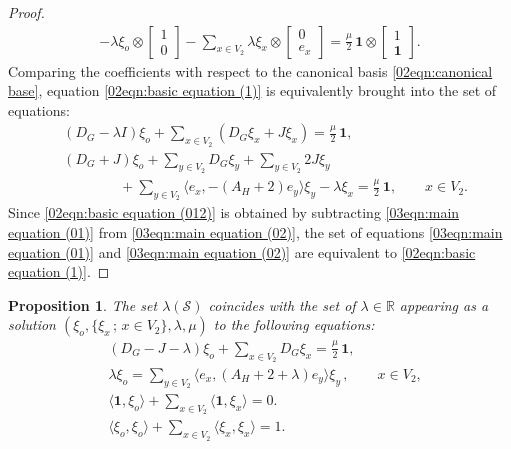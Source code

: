 \documentclass[12pt,a4paper]{article}
\newtheorem{proposition}[theorem]{Proposition}
\newcommand{\1}{{\bm 1}}
\numberwithin{equation}{section}
\begin{document}
\begin{proof}
\begin{align*}
-\lambda \xi_o\otimes \begin{bmatrix} 1 \\ 0 \end{bmatrix}
-\sum_{x\in V_2} 
  \lambda \xi_x\otimes \begin{bmatrix} 0 \\ e_x \end{bmatrix}
=\frac{\mu}{2}\,
 \mathbf{1}\otimes \begin{bmatrix} 1 \\ \mathbf{1} \end{bmatrix}.
\end{align*}
%
Comparing the coefficients with respect to the canonical basis
\eqref{02eqn:canonical base}, 
equation \eqref{02eqn:basic equation (1)} is equivalently
brought into the set of equations:
%
\begin{align}
&(D_G-\lambda I)\xi_o 
+\sum_{x\in V_2}(D_G\xi_x+J\xi_x)=\frac{\mu}{2}\,\bm{1},
\label{03eqn:main equation (01)}\\
&(D_G+J)\xi_o 
+\sum_{y\in V_2}D_G\xi_y
+\sum_{y\in V_2}2J\xi_y
\nonumber \\
&\qquad\qquad +\sum_{y\in V_2} \langle e_x, -(A_H+2)e_y\rangle \xi_y
-\lambda\xi_x
=\frac{\mu}{2}\,\mathbf{1},
\qquad x\in V_2.
\label{03eqn:main equation (02)} 
\end{align}
%
Since \eqref{02eqn:basic equation (012)} is obtained
by subtracting \eqref{03eqn:main equation (01)} from
\eqref{03eqn:main equation (02)},
the set of equations \eqref{03eqn:main equation (01)} and
\eqref{03eqn:main equation (02)} are equivalent to
\eqref{02eqn:basic equation (1)}.
\end{proof}


\begin{proposition}\label{03prop:reformulated basic equations}
The set $\lambda(\mathcal{S})$ coincides with
the set of $\lambda\in\mathbb{R}$ appearing
as a solution $(\xi_o,\{\xi_x\,;\, x \in V_2\}, \lambda, \mu)$
to the following equations:
%
\begin{align}
&(D_G-J-\lambda)\xi_o 
+\sum_{x\in V_2}D_G\xi_x=\frac{\mu}{2}\,\mathbf{1},
\label{02eqn:basic equation (11)}
\\
&\lambda\xi_o
=\sum_{y\in V_2} \langle e_x, (A_H+2+\lambda)e_y\rangle \xi_y\,,
\qquad x\in V_2,
\label{02eqn:basic equation (12)}
\\
&\langle \bm{1}, \xi_o\rangle
+\sum_{x\in V_2} \langle \bm{1}, \xi_x\rangle=0.
\label{02eqn:basic equation (13)}
\\
&\langle \xi_o, \xi_o\rangle
+\sum_{x\in V_2} \langle \xi_x, \xi_x\rangle=1.
\label{02eqn:basic equation (14)}
\end{align}
\end{proposition}
\end{document}
